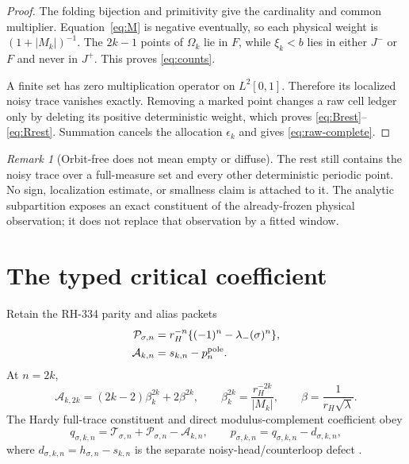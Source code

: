 \documentclass[11pt]{article}
\theoremstyle{remark}
\newtheorem{remark}[theorem]{Remark}
\newcommand{\cP}{\mathcal P}
\newcommand{\cA}{\mathcal A}
\newcommand{\cT}{\mathcal T}
\begin{document}
\begin{proof}
The folding bijection and primitivity give the cardinality and common
multiplier.  Equation~\eqref{eq:M} is negative eventually, so each physical
weight is $(1+|M_k|)^{-1}$.  The $2k-1$ points of $\Omega_k$ lie in $F$, while
$\xi_k<b$ lies in either $J^-$ or $F$ and never in $J^+$.  This proves
\eqref{eq:counts}.

A finite set has zero multiplication operator on $L^2[0,1]$.  Therefore its
localized noisy trace vanishes exactly.  Removing a marked point changes a
raw cell ledger only by deleting its positive deterministic weight, which
proves \eqref{eq:Brest}--\eqref{eq:Rrest}.  Summation cancels the allocation
$\epsilon_k$ and gives \eqref{eq:raw-complete}.
\end{proof}

\begin{remark}[Orbit-free does not mean empty or diffuse]
The rest still contains the noisy trace over a full-measure set and every
other deterministic periodic point.  No sign, localization estimate, or
smallness claim is attached to it.  The analytic subpartition exposes an
exact constituent of the already-frozen physical observation; it does not
replace that observation by a fitted window.
\end{remark}

\section{The typed critical coefficient}

Retain the RH-334 parity and alias packets
\begin{align}
 \cP_{\sigma,n}&=r_H^{-n}\{(-1)^n-\lambda_-(\sigma)^n\},
 \label{eq:parity}\\
 \cA_{k,n}&=s_{k,n}-p_n^{\rm pole}.
 \label{eq:alias-general}
\end{align}
At $n=2k$,
\begin{equation}\label{eq:alias}
 \cA_{k,2k}=(2k-2)\beta_k^{2k}+2\beta^{2k},\qquad
 \beta_k^{2k}=\frac{r_H^{-2k}}{|M_k|},\qquad
 \beta=\frac1{r_H\sqrt\lambda}.
\end{equation}
The Hardy full-trace constituent and direct modulus-complement coefficient
obey
\begin{equation}\label{eq:pq}
 q_{\sigma,k,n}=\cT_{\sigma,n}+\cP_{\sigma,n}-\cA_{k,n},
 \qquad
 p_{\sigma,k,n}=q_{\sigma,k,n}-d_{\sigma,k,n},
\end{equation}
where $d_{\sigma,k,n}=h_{\sigma,n}-s_{k,n}$ is the separate
noisy-head/counterloop defect \citep{WangObservation2026}.
\end{document}
